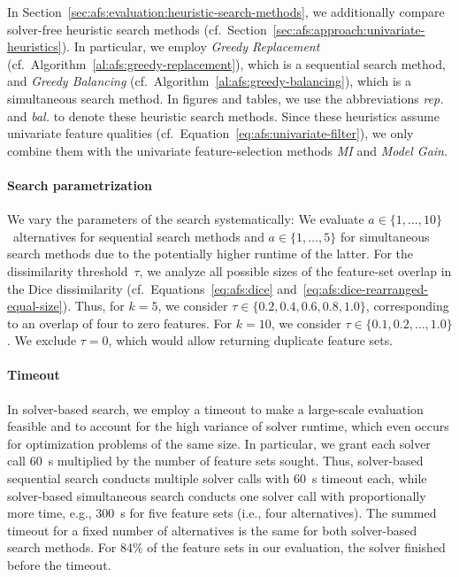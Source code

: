 \documentclass{article}
\theoremstyle{definition}
\begin{document}
In Section~\ref{sec:afs:evaluation:heuristic-search-methods}, we additionally compare solver-free heuristic search methods (cf.~Section~\ref{sec:afs:approach:univariate-heuristics}).
In particular, we employ \emph{Greedy Replacement} (cf.~Algorithm~\ref{al:afs:greedy-replacement}), which is a sequential search method, and \emph{Greedy Balancing} (cf.~Algorithm~\ref{al:afs:greedy-balancing}), which is a simultaneous search method.
In figures and tables, we use the abbreviations \emph{rep.} and \emph{bal.} to denote these heuristic search methods.
Since these heuristics assume univariate feature qualities (cf.~Equation~\ref{eq:afs:univariate-filter}), we only combine them with the univariate feature-selection methods \emph{MI} and \emph{Model Gain}.

\paragraph{Search parametrization}

We vary the parameters of the search systematically:
We evaluate $a \in \{1, \dots, 10\}$~alternatives for sequential search methods and $a \in \{1, \dots, 5\}$ for simultaneous search methods due to the potentially higher runtime of the latter.
For the dissimilarity threshold~$\tau$, we analyze all possible sizes of the feature-set overlap in the Dice dissimilarity (cf.~Equations~\ref{eq:afs:dice} and~\ref{eq:afs:dice-rearranged-equal-size}).
Thus, for $k=5$, we consider $\tau \in \{0.2, 0.4, 0.6, 0.8, 1.0\}$, corresponding to an overlap of four to zero features.
For $k=10$, we consider $\tau \in \{0.1, 0.2, \dots, 1.0\}$.
We exclude $\tau = 0$, which would allow returning duplicate feature sets.

\paragraph{Timeout}

In solver-based search, we employ a timeout to make a large-scale evaluation feasible and to account for the high variance of solver runtime, which even occurs for optimization problems of the same size.
In particular, we grant each solver call 60~s multiplied by the number of feature sets sought.
Thus, solver-based sequential search conducts multiple solver calls with 60~s timeout each, while solver-based simultaneous search conducts one solver call with proportionally more time, e.g., 300~s for five feature sets (i.e., four alternatives).
The summed timeout for a fixed number of alternatives is the same for both solver-based search methods.
For 84\% of the feature sets in our evaluation, the solver finished before the timeout.
\end{document}
